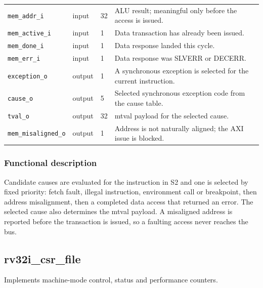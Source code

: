 \documentclass[11pt]{article}
\begin{document}
{\begin{longtable}{@{}L{0.3400\dimexpr\linewidth-36pt\relax}L{0.1000\dimexpr\linewidth-36pt\relax}L{0.1000\dimexpr\linewidth-36pt\relax}L{0.4600\dimexpr\linewidth-36pt\relax}@{}}
\texttt{mem\_addr\_i} & input & 32 & ALU result; meaningful only before the access is issued. \\ \addlinespace[3pt]
\texttt{mem\_active\_i} & input & 1 & Data transaction has already been issued. \\ \addlinespace[3pt]
\texttt{mem\_done\_i} & input & 1 & Data response landed this cycle. \\ \addlinespace[3pt]
\texttt{mem\_err\_i} & input & 1 & Data response was SLVERR or DECERR. \\ \addlinespace[3pt]
\texttt{exception\_o} & output & 1 & A synchronous exception is selected for the current instruction. \\ \addlinespace[3pt]
\texttt{cause\_o} & output & 5 & Selected synchronous exception code from the cause table. \\ \addlinespace[3pt]
\texttt{tval\_o} & output & 32 & mtval payload for the selected cause. \\ \addlinespace[3pt]
\texttt{mem\_misaligned\_o} & output & 1 & Address is not naturally aligned; the AXI issue is blocked. \\*
\bottomrule\end{longtable}}
\subsubsection{Functional description}
\noindent Candidate causes are evaluated for the instruction in S2 and one is selected by fixed priority: fetch fault, illegal instruction, environment call or breakpoint, then address misalignment, then a completed data access that returned an error. The selected cause also determines the mtval payload. A misaligned address is reported before the transaction is issued, so a faulting access never reaches the bus.\par\medskip

\subsection{rv32i\_csr\_file}
Implements machine-mode control, status and performance counters.
\end{document}
